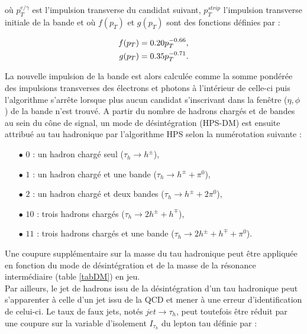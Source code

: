 où $p_T^{e/\gamma}$ est l'impulsion transverse du candidat suivant, $p_T^{strip}$ l'impulsion transverse initiale de la bande et où $f(p_T)$ et $g(p_T)$ sont des fonctions définies par :

\begin{align*}
    f(p_T) & = 0.20 p_T^{-0.66}, \\
    g(p_T) & = 0.35 p_T^{-0.71}.
    \vspace{5pt} 
\end{align*}

La nouvelle impulsion de la bande est alors calculée comme la somme pondérée des impulsions transverses des électrons et photons à l'intérieur de celle-ci puis l'algorithme s'arrête lorsque plus aucun candidat s'inscrivant dans la fenêtre ($\eta,\phi$) de la bande n'est trouvé. A partir du nombre de hadrons chargés et de bandes au sein du cône de signal, un mode de désintégration (HPS-DM) est ensuite attribué au tau hadronique par l'algorithme HPS selon la numérotation suivante :

\begin{itemize}
    \medskip
    \item[$\bullet$] $0$ : un hadron chargé seul ($\tau_h\rightarrow h^{\pm}$),
    \medskip
    \item[$\bullet$] $1$ : un hadron chargé et une bande ($\tau_h\rightarrow h^{\pm}+\pi^0$),
    \medskip
    \item[$\bullet$] $2$ : un hadron chargé et deux bandes ($\tau_h\rightarrow h^{\pm}+2\pi^0$),
    \medskip
    \item[$\bullet$] $10$ : trois hadrons chargés ($\tau_h\rightarrow 2h^{\pm}+h^{\mp}$),
    \medskip
    \item[$\bullet$] $11$ : trois hadrons chargés et une bande ($\tau_h\rightarrow 2h^{\pm}+h^{\mp}+\pi^0$).
    \medskip
\end{itemize}

Une coupure supplémentaire sur la masse du tau hadronique peut être appliquée en fonction du mode de désintégration et de la masse de la résonance intermédiaire (table \ref{tabDM}) en jeu. \\

Par ailleurs, le jet de hadrons issu de la désintégration d'un tau hadronique peut s'apparenter à celle d'un jet issu de la QCD et mener à une erreur d'identification de celui-ci. Le taux de faux jets, notés $jet\rightarrow\tau_h$, peut toutefois être réduit par une coupure sur la variable d'isolement $I_{\tau_h}$ du lepton tau définie par :

